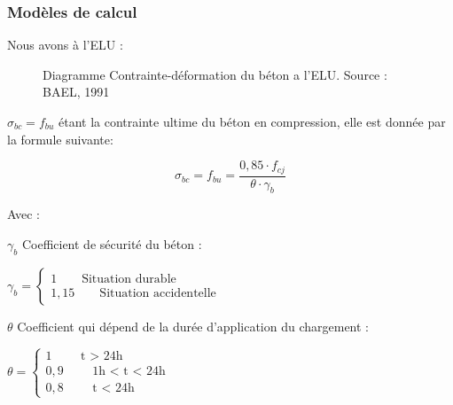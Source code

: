 \documentclass[12pt,a4paper]{report}
\numberwithin{equation}{section}
\newcommand{\sgma}[1]{\sigma_{#1}}
\begin{document}
	
	
	\subsubsection{Modèles de calcul}
	
	Nous avons à l'ELU :
	
	\begin{figure}[H]
		\centering
		\caption{Diagramme Contrainte-déformation du béton a l'ELU. Source : BAEL, 1991\protect\footnotemark[2]}
		\label{fig:diagramme-ELU-beton}
	\end{figure}
	
	
	$\sgma{bc} = f_{bu}$ étant la contrainte ultime du béton en compression, elle est donnée par la formule suivante\footnotemark[2] :
	
	\begin{equation}
		\sgma{bc} = f_{bu} = \dfrac{0,85 \cdot f_{cj}}{\theta \cdot \gamma_{b}}
		\label{eq:fbu}
	\end{equation}
	
	
	Avec :
	
	$\gamma_{b}$ Coefficient de sécurité du béton : 
	
	$\gamma_{b} = \begin{cases}
		1 \qquad \text{Situation durable} \\
		1,15 \qquad \text{Situation accidentelle}
	\end{cases}$
	
	\vspace{\baselineskip}
	
	$\theta$ Coefficient qui dépend de la durée d'application du chargement :
	
	$\theta = \begin{cases}
		1 \qquad \text{ t > 24h} \\
		0,9 \qquad \text{ 1h < t < 24h} \\
		0,8 \qquad \text{ t < 24h}
	\end{cases}$
	
\end{document}
